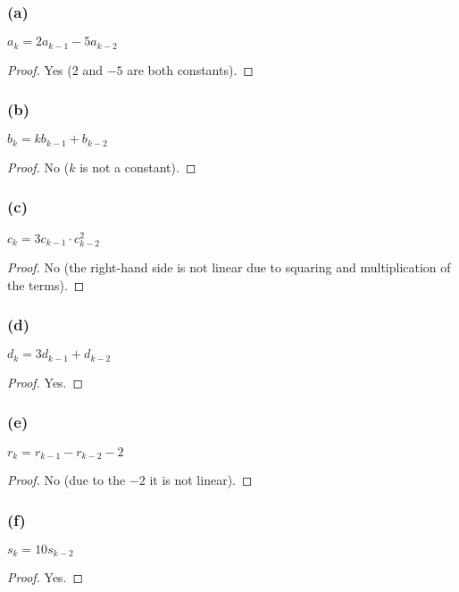 \documentclass[14pt]{extarticle}
\begin{document}
\subsubsection{(a)}
\(a_k = 2a_{k-1} - 5a_{k-2}\)

\begin{proof}
    Yes (2 and $-5$ are both constants).
\end{proof}

\subsubsection{(b)}
\(b_k = kb_{k-1} + b_{k-2}\)

\begin{proof}
    No ($k$ is not a constant).
\end{proof}

\subsubsection{(c)}
\(c_k = 3c_{k-1} \cdot c^2_{k - 2}\)

\begin{proof}
    No (the right-hand side is not linear due to squaring and multiplication of the terms).
\end{proof}

\subsubsection{(d)}
\(d_k = 3d_{k-1} + d_{k-2}\)

\begin{proof}
    Yes.
\end{proof}

\subsubsection{(e)}
\(r_k = r_{k-1} - r_{k-2} - 2\)

\begin{proof}
    No (due to the $-2$ it is not linear).
\end{proof}

\subsubsection{(f)}
\(s_k = 10s_{k-2}\)

\begin{proof}
    Yes.
\end{proof}
\end{document}
